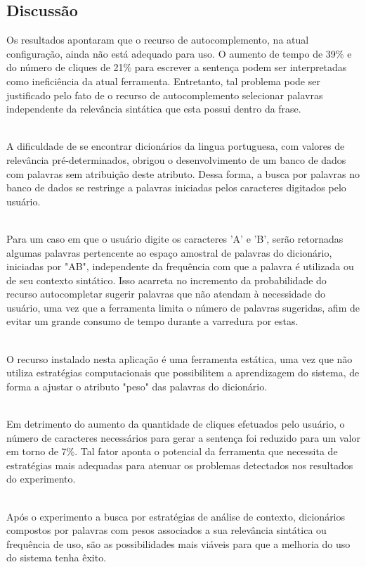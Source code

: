 \documentclass[twoside]{article}
\begin{document}
\begin{multicols}{2}
\section{Discussão}
Os resultados apontaram que o recurso de autocomplemento, na atual configuração, ainda não está adequado para uso. O aumento de tempo de 39\% e do número de cliques de 21\% para escrever a sentença podem ser interpretadas como ineficiência da atual ferramenta. Entretanto, tal problema pode ser justificado pelo fato de o recurso de autocomplemento selecionar palavras independente da relevância sintática que esta possui dentro da frase. 

\noindent \\A dificuldade de se encontrar dicionários da lingua portuguesa, com valores de relevância pré-determinados, obrigou o desenvolvimento de um banco de dados com palavras sem atribuição deste atributo. Dessa forma, a busca por palavras no banco de dados se restringe a palavras iniciadas pelos caracteres digitados pelo usuário. 

\noindent \\Para um caso em que o usuário digite os caracteres 'A' e 'B', serão retornadas algumas palavras pertencente ao espaço amostral de palavras do dicionário, iniciadas por "AB", independente da frequência com que a palavra é utilizada ou de seu contexto sintático. Isso acarreta no incremento da probabilidade do recurso autocompletar sugerir palavras que não atendam à necessidade do usuário, uma vez que a ferramenta limita o número de palavras sugeridas, afim de evitar um grande consumo de tempo durante a varredura por estas.

\noindent \\O recurso instalado nesta aplicação é uma ferramenta estática, uma vez que não utiliza estratégias computacionais que possibilitem a aprendizagem do sistema, de forma a ajustar o atributo "peso" das palavras do dicionário.

\noindent \\Em detrimento do aumento da quantidade de cliques efetuados pelo usuário, o número de caracteres necessários para gerar a sentença foi reduzido para um valor em torno de 7\%. Tal fator aponta o potencial da ferramenta que necessita de estratégias mais adequadas para atenuar os problemas detectados nos resultados do experimento.

\noindent \\Após o experimento a busca por estratégias de análise de contexto, dicionários compostos por palavras com pesos associados a sua relevância sintática ou frequência de uso, são as possibilidades mais viáveis para que a melhoria do uso do sistema tenha êxito.


\end{multicols}
\end{document}
